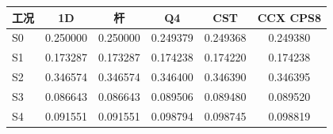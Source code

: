 \begin{tabular}{@{}lS[table-format=1.6]S[table-format=1.6]S[table-format=1.6]S[table-format=1.6]S[table-format=1.6]@{}}
\toprule
工况 & {1D} & {杆} & {Q4} & {CST} & {CCX CPS8} \\
\midrule
S0 & 0.250000 & 0.250000 & 0.249379 & 0.249368 & 0.249380 \\
S1 & 0.173287 & 0.173287 & 0.174238 & 0.174220 & 0.174238 \\
S2 & 0.346574 & 0.346574 & 0.346400 & 0.346390 & 0.346395 \\
S3 & 0.086643 & 0.086643 & 0.089506 & 0.089480 & 0.089520 \\
S4 & 0.091551 & 0.091551 & 0.098794 & 0.098745 & 0.098819 \\
\bottomrule
\end{tabular}
